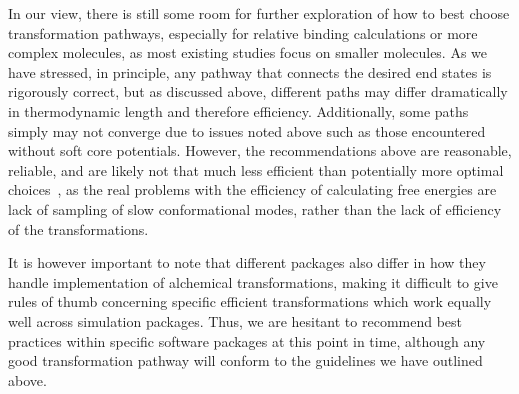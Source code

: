 \documentclass[9pt,bestpractices,pubversion]{livecoms}
\begin{document}
In our view, there is still some room for further exploration of how to best choose transformation pathways, especially for relative binding calculations or more complex molecules, as most existing studies focus on smaller molecules. As we have stressed, in principle, any pathway that connects the desired end states is rigorously correct, but as discussed above, different paths may differ dramatically in thermodynamic length and therefore efficiency. Additionally, some paths simply may not converge due to issues noted above such as those encountered without soft core potentials. However, the recommendations above are reasonable, reliable, and are likely not that much less efficient than potentially more optimal choices~\cite{naden2014linear,naden2015linear,pham2012optimal}, as the real problems with the efficiency of calculating free energies are lack of sampling of slow conformational modes, rather than the lack of efficiency of the transformations. 

It is however important to note that different packages also differ in how they handle implementation of alchemical transformations, making it difficult to give rules of thumb concerning specific efficient transformations which work equally well across simulation packages. Thus, we are hesitant to recommend best practices within specific software packages at this point in time, although any good transformation pathway will conform to the guidelines we have outlined above.
\end{document}
